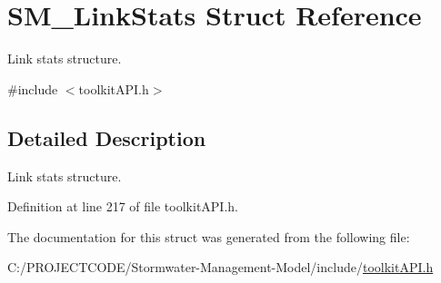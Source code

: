 \hypertarget{struct_s_m___link_stats}{}\section{S\+M\+\_\+\+Link\+Stats Struct Reference}
\label{struct_s_m___link_stats}


Link stats structure.  




{\ttfamily \#include $<$toolkit\+A\+P\+I.\+h$>$}



\subsection{Detailed Description}
Link stats structure. 

Definition at line 217 of file toolkit\+A\+P\+I.\+h.



The documentation for this struct was generated from the following file\+:\begin{DoxyCompactItemize}
\item 
C\+:/\+P\+R\+O\+J\+E\+C\+T\+C\+O\+D\+E/\+Stormwater-\/\+Management-\/\+Model/include/\hyperlink{toolkit_a_p_i_8h}{toolkit\+A\+P\+I.\+h}\end{DoxyCompactItemize}
